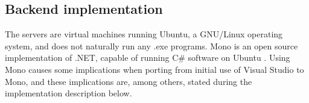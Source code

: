 \subsection{Backend implementation}\label{subsec:backend_impl}
The servers are virtual machines running Ubuntu, a GNU/Linux operating system, and does not naturally run any .exe programs. Mono is an open source implementation of .NET, capable of running C\# software on Ubuntu \citep{mono}. Using Mono causes some implications when porting from initial use of Visual Studio to Mono, and these implications are, among others, stated during the implementation description below. 


